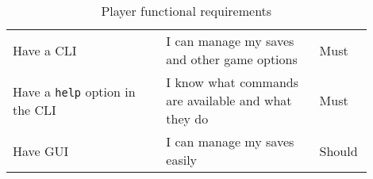 \begin{table}[H]
\begin{tabular}{p{0.4\linewidth}|p{0.4\linewidth}|p{0.1\linewidth}}
        Have a CLI                                                 & I can manage my saves and other game options                       & Must           \\
        Have a \texttt{help} option in the CLI                     & I know what commands are available and what they do                & Must           \\
        Have GUI                                                   & I can manage my saves easily                                       & Should         \\ \hline
    \end{tabular}
    \caption{Player functional requirements}
\end{table}